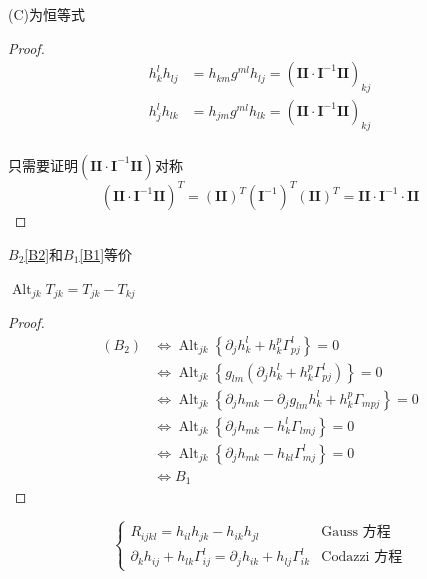 \documentclass[lang=cn,10pt,thmcnt=section]{elegantbook}
\begin{document}
\begin{proposition}
    (C)为恒等式
\end{proposition}
\begin{proof}
    
    \begin{align*}
        h^l_kh_{lj}&=h_{km}g^{ml}h_{lj}=(\mathbf{ II}\cdot\mathbf{ I}^{-1}\mathbf{ II})_{kj}\\
        h^l_j h_{lk}&=h_{jm}g^{ml}h_{lk}=(\mathbf{ II}\cdot\mathbf{ I}^{-1}\mathbf{ II})_{kj}\\
    \end{align*}

    只需要证明$(\mathbf{ II}\cdot\mathbf{ I}^{-1}\mathbf{ II})$对称
    \[
    (\mathbf{ II}\cdot\mathbf{ I}^{-1}\mathbf{ II})^T=(\mathbf{ II})^T(\mathbf{ I}^{-1})^T(\mathbf{ II})^T=\mathbf{ II}\cdot\mathbf{ I}^{-1}\cdot\mathbf{ II}
    \]
\end{proof}

\begin{proposition}
    $B_2$\ref{B2}和$B_1$\ref{B1}等价
\end{proposition}
\begin{remark}
    $\operatorname{Alt}_{jk} T_{jk}=T_{jk}-T_{kj}$
\end{remark}
\begin{proof}
    \begin{align*}
        (B_2) &\iff \operatorname{Alt}_{jk} \left\{ \partial_j h_k^l + h_k^p \Gamma_{pj}^l \right\} = 0 \\
        &\iff \operatorname{Alt}_{jk} \left\{ g_{lm} (\partial_j h_k^l + h_k^p \Gamma_{pj}^l) \right\} = 0 \\
        &\iff \operatorname{Alt}_{jk} \left\{ \partial_j h_{mk} - \partial_j g_{lm} h_k^l + h_k^p \Gamma_{mpj} \right\} = 0 \\
        &\iff \operatorname{Alt}_{jk} \left\{ \partial_j h_{mk} - h_k^l \Gamma_{lmj} \right\} = 0 \\
        &\iff \operatorname{Alt}_{jk} \left\{ \partial_j h_{mk} - h_{kl} \Gamma^l_{mj} \right\} = 0 \\
        &\iff B_1
    \end{align*}
\end{proof}

\begin{proposition}[曲面结构方程]
    \[
\begin{cases} 
R_{ijkl} = h_{il}h_{jk} - h_{ik}h_{jl} & \text{Gauss 方程} \\
\partial_{k}h_{ij} + h_{lk}\Gamma_{ij}^{l} = \partial_{j}h_{ik} + h_{lj}\Gamma_{ik}^{l} & \text{Codazzi 方程}
\end{cases}
\]
\end{proposition}
\end{document}
